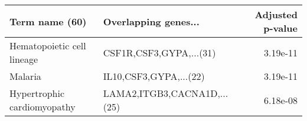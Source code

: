 \begin{tabular}{llr}
\toprule
             Term name (60) &        Overlapping genes... &  Adjusted p-value \\
\midrule
 Hematopoietic cell lineage &     CSF1R,CSF3,GYPA,...(31) &          3.19e-11 \\
                    Malaria &      IL10,CSF3,GYPA,...(22) &          3.19e-11 \\
Hypertrophic cardiomyopathy & LAMA2,ITGB3,CACNA1D,...(25) &          6.18e-08 \\
\bottomrule
\end{tabular}
